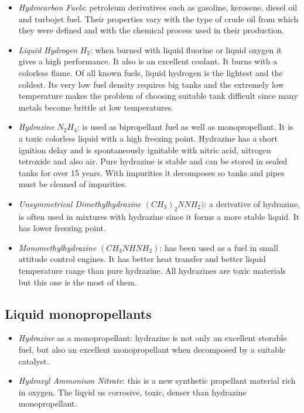 \documentclass[12pt]{article}
\begin{document}
\begin{itemize}
    \item \textit{Hydrocarbon Fuels}: petroleum derivatives such as gasoline, kerosene, diesel oil and turbojet fuel. Their properties vary with the type of crude oil from which they were defined and with the chemical process used in their production.
    \item \textit{Liquid Hydrogen} $H_{2}$: when burned with liquid fluorine or liquid oxygen it gives a high performance. It also is an excellent coolant. It burns with a colorless flame. Of all known fuels, liquid hydrogen is the lightest and the coldest. Its very low fuel density requires big tanks and the extremely low temperature makes the problem of choosing suitable tank difficult since many metals become brittle at low temperatures.
    \item \textit{Hydrazine} $N_{2}H_{4}$: is used as bipropellant fuel as well as monopropellant. It is a toxic colorless liquid with a high freezing point. Hydrazine has a short ignition delay and is spontaneously ignitable with nitric acid, nitrogen tetroxide and also air. Pure hydrazine is stable and can be stored in sealed tanks for over 15 years. With impurities it decomposes so tanks and pipes must be cleaned of impurities.
    \item \textit{Unsymmetrical Dimethylhydrazine} $(CH_{3})_{2}NNH_{2})$: a derivative of hydrazine, is often used in mixtures with hydrazine since it forms a more stable liquid. It has lower freezing point.
    \item \textit{Monomethylhydrazine} $(CH_{3}NHNH_{2})$: has been used as a fuel in small attitude control engines. It has better heat transfer and better liquid temperature range than pure hydrazine. All hydrazines are toxic materials but this one is the most of them.
\end{itemize}

\subsection{Liquid monopropellants}

\begin{itemize}
    \item \textit{Hydrazine} as a monopropellant: hydrazine is not only an excellent storable fuel, but also an excellent monopropellant when decomposed by a suitable catalyst.
    \item \textit{Hydroxyl Ammonium Nitrate}: this is a new synthetic propellant material rich in oxygen. The liqyid us corrosive, toxic, denser than hydrazine monopropellant.
\end{itemize}
\end{document}
